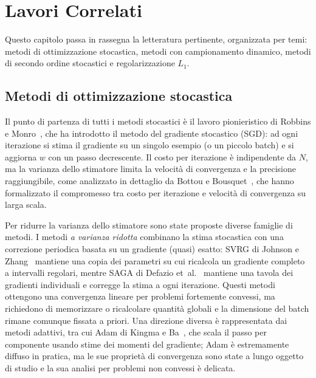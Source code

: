 \section{Lavori Correlati}\label{sec:lavori}

Questo capitolo passa in rassegna la letteratura pertinente, organizzata per
temi: metodi di ottimizzazione stocastica, metodi con campionamento dinamico,
metodi di secondo ordine stocastici e regolarizzazione $L_1$.

\subsection{Metodi di ottimizzazione stocastica}

Il punto di partenza di tutti i metodi stocastici è il lavoro pionieristico di
Robbins e Monro~\cite{robbins1951}, che ha introdotto il metodo del gradiente
stocastico (SGD): ad ogni iterazione si stima il gradiente su un singolo
esempio (o un piccolo batch) e si aggiorna $w$ con un passo decrescente.
Il costo per iterazione è indipendente da $N$, ma la varianza dello stimatore
limita la velocità di convergenza e la precisione raggiungibile, come analizzato
in dettaglio da Bottou e Bousquet~\cite{bottou2008}, che hanno formalizzato il
compromesso tra costo per iterazione e velocità di convergenza su larga scala.

Per ridurre la varianza dello stimatore sono state proposte diverse famiglie di
metodi. I metodi \emph{a varianza ridotta} combinano la stima stocastica con
una correzione periodica basata su un gradiente (quasi) esatto: SVRG di Johnson
e Zhang~\cite{johnson2013} mantiene una copia dei parametri su cui ricalcola un
gradiente completo a intervalli regolari, mentre SAGA di Defazio
et~al.~\cite{defazio2014} mantiene una tavola dei gradienti individuali e
corregge la stima a ogni iterazione. Questi metodi ottengono una convergenza
lineare per problemi fortemente convessi, ma richiedono di memorizzare o
ricalcolare quantità globali e la dimensione del batch rimane comunque fissata
a priori. Una direzione diversa è rappresentata dai metodi adattivi, tra cui
Adam di Kingma e Ba~\cite{kingma2015}, che scala il passo per componente usando
stime dei momenti del gradiente; Adam è estremamente diffuso in pratica, ma le
sue proprietà di convergenza sono state a lungo oggetto di studio e la sua
analisi per problemi non convessi è delicata.


